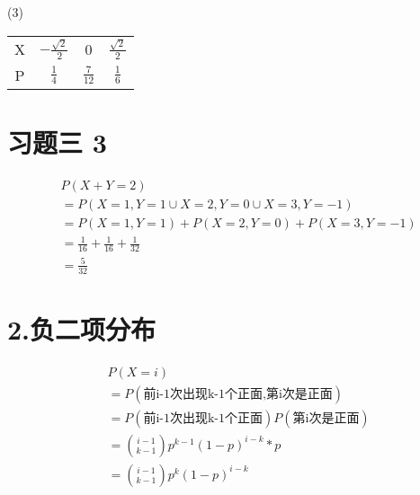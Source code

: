 \documentclass[a4paper,twocolumn]{ctexart}
\begin{document}
\noindent(3)\\
\begin{center}
	\begin{tabular}{cccc}
		\hline
		\hline
		X&$-\frac{\sqrt{2}}{2}$&0&$\frac{\sqrt{2}}{2}$\\
		P&$\frac{1}{4}$&$\frac{7}{12}$&$\frac{1}{6}$\\
		\hline
	\end{tabular}
\end{center}

\section*{习题三 3}
\begin{align*}
&P(X+Y=2)\\
&=P(X=1,Y=1\cup X=2,Y=0 \cup X=3,Y=-1)\\
&=P(X=1,Y=1)+P(X=2,Y=0)+P(X=3,Y=-1)\\
&=\frac{1}{16}+\frac{1}{16}+\frac{1}{32}\\
&=\frac{5}{32}
\end{align*}

\section*{2.负二项分布}

\begin{align*}
&P(X=i)\\
&=P(\text{前i-1次出现k-1个正面,第i次是正面})\\
&=P(\text{前i-1次出现k-1个正面})P(\text{第i次是正面})\\
&=\binom{i-1}{k-1}p^{k-1}(1-p)^{i-k}*p\\
&=\binom{i-1}{k-1}p^k(1-p)^{i-k}
\end{align*}
\end{document}
